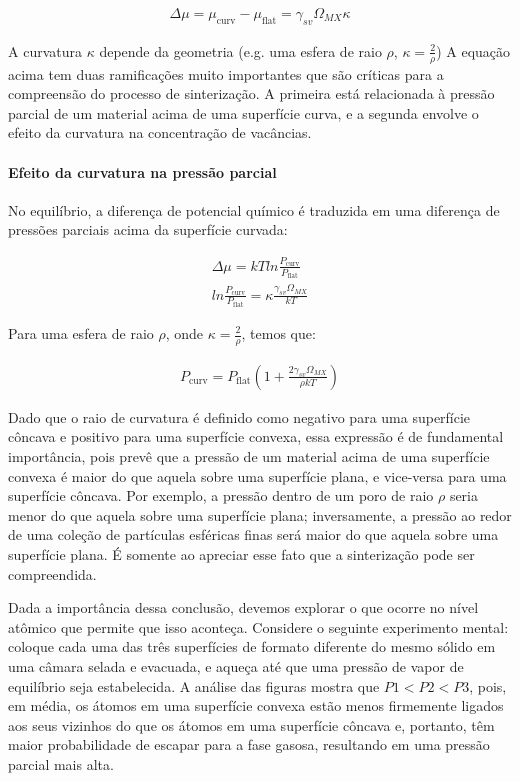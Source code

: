 \begin{gather}
    \Delta\mu = \mu_{\text{curv}} - \mu_{\text{flat}} = \gamma_{sv} \Omega_{MX} \kappa
\end{gather}

A curvatura $\kappa$ depende da geometria (e.g. uma esfera de raio $\rho$, $\kappa = \frac{2}{\rho}$) A equação acima tem duas ramificações muito importantes que são críticas para a compreensão do processo de sinterização. A primeira está relacionada à pressão parcial de um material acima de uma superfície curva, e a segunda envolve o efeito da curvatura na concentração de vacâncias.

\paragraph*{Efeito da curvatura na pressão parcial}

No equilíbrio, a diferença de potencial químico é traduzida em uma diferença de pressões parciais acima da superfície curvada:

\begin{gather}
    \Delta\mu = kT ln \frac{P_{\text{curv}}}{P_{\text{flat}}} \\
    ln \frac{P_{\text{curv}}}{P_{\text{flat}}} = \kappa \frac{\gamma_{sv} \Omega_{MX}}{kT}
\end{gather}

Para uma esfera de raio $\rho$, onde $\kappa = \frac{2}{\rho}$, temos que:

\begin{gather}
    P_{\text{curv}} = P_{\text{flat}} \left( 1 + \frac{2\gamma_{sv} \Omega_{MX}}{\rho k T} \right)
\end{gather}

Dado que o raio de curvatura é definido como negativo para uma superfície côncava e positivo para uma superfície convexa, essa expressão é de fundamental importância, pois prevê que a pressão de um material acima de uma superfície convexa é maior do que aquela sobre uma superfície plana, e vice-versa para uma superfície côncava. Por exemplo, a pressão dentro de um poro de raio $\rho$ seria menor do que aquela sobre uma superfície plana; inversamente, a pressão ao redor de uma coleção de partículas esféricas finas será maior do que aquela sobre uma superfície plana. É somente ao apreciar esse fato que a sinterização pode ser compreendida.

Dada a importância dessa conclusão, devemos explorar o que ocorre no nível atômico que permite que isso aconteça. Considere o seguinte experimento mental: coloque cada uma das três superfícies de formato diferente do mesmo sólido em uma câmara selada e evacuada, e aqueça até que uma pressão de vapor de equilíbrio seja estabelecida. A análise das figuras mostra que $P1 < P2 < P3$, pois, em média, os átomos em uma superfície convexa estão menos firmemente ligados aos seus vizinhos do que os átomos em uma superfície côncava e, portanto, têm maior probabilidade de escapar para a fase gasosa, resultando em uma pressão parcial mais alta.

